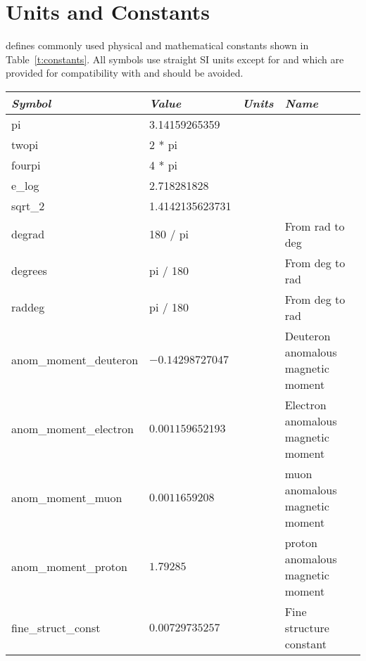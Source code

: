 \section{Units and Constants}
\label{s:constants}

\bmad defines commonly used physical and mathematical constants
shown in Table~\ref{t:constants}.  All symbols use straight SI units
except for  and  which are provided for
compatibility with \mad and should be avoided.

\begin{table}[h]
\centering
\begin{tabular}{llll} \toprule
  {\em Symbol}          & {\em Value}       & {\em Units}     &  {\em Name}           \\ \midrule
  pi                    & 3.14159265359          &            &                       \\
  twopi                 & 2 * pi                 &            &                       \\
  fourpi                & 4 * pi                 &            &                       \\
  e_log                 & 2.718281828            &            &                       \\
  sqrt_2                & 1.4142135623731        &            &                       \\
  degrad                & 180 / pi               &            & From rad to deg       \\
  degrees               & pi / 180               &            & From deg to rad       \\
  raddeg                & pi / 180               &            & From deg to rad       \\
  anom_moment_deuteron  & $-0.14298727047$       &            & Deuteron anomalous magnetic moment \\
  anom_moment_electron  & $0.001159652193$       &            & Electron anomalous magnetic moment \\
  anom_moment_muon      & $0.0011659208$         &            & muon anomalous magnetic moment     \\
  anom_moment_proton    & $1.79285$              &            & proton anomalous magnetic moment   \\
  fine_struct_const     & $0.00729735257$        &            & Fine structure constant            \\

\end{tabular}
\end{table}

